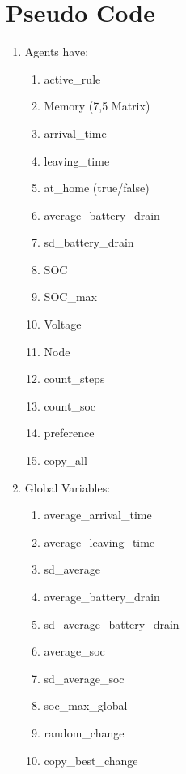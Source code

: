 \documentclass[a4paper]{article}
\begin{document}
\section{Pseudo Code}
\begin{enumerate}
 \item Agents have:\begin{enumerate}
                    \item active\_rule
                    \item Memory (7,5 Matrix)
                    \item arrival\_time
                    \item leaving\_time
                    \item at\_home (true/false)
                    \item average\_battery\_drain
                    \item sd\_battery\_drain
                    \item SOC
                    \item SOC\_max
                    \item Voltage
                    \item Node
                    \item count\_steps
                    \item count\_soc
                    \item preference
                    \item copy\_all
                   \end{enumerate}
 \item Global Variables: \begin{enumerate}
                          \item average\_arrival\_time
                          \item average\_leaving\_time
                          \item sd\_average
                          \item average\_battery\_drain
                          \item sd\_average\_battery\_drain
                          \item average\_soc
                          \item sd\_average\_soc
                          \item soc\_max\_global
                          \item random\_change
                          \item copy\_best\_change

\end{enumerate}
\end{enumerate}
\end{document}
